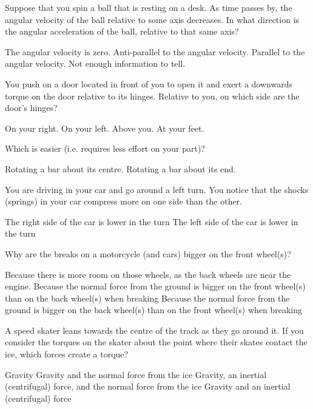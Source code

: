 \question Suppose that you spin a ball that is resting on a desk. As time passes by, the angular velocity of the ball relative to some axis decreases. In what direction is the angular acceleration of the ball, relative to that same axis?
\begin{checkboxes}
\choice The angular velocity is zero.
\CorrectChoice Anti-parallel to the angular velocity.
\choice Parallel to the angular velocity.
\choice Not enough information to tell.
\end{checkboxes}

\question You push on a door located in front of you to open it and exert a downwards torque on the door relative to its hinges. Relative to you, on which side are the door's hinges? 
\begin{checkboxes}
\CorrectChoice On your right.
\choice On your left. 
\choice Above you.
\choice At your feet.
\end{checkboxes}

\question Which is easier (i.e. requires less effort on your part)?
\begin{checkboxes}
\CorrectChoice Rotating a bar about its centre.
\choice Rotating a bar about its end.
\end{checkboxes}

\question You are driving in your car and go around a left turn. You notice that the shocks (springs) in your car compress more on one side than the other. 
\begin{checkboxes}
\CorrectChoice The right side of the car is lower in the turn \correct
\choice The left side of the car is lower in the turn
\end{checkboxes}

\question Why are the breaks on a motorcycle (and cars) bigger on the front wheel(s)?
\begin{checkboxes}
\choice Because there is more room on those wheels, as the back wheels are near the engine.
\CorrectChoice Because the normal force from the ground is bigger on the front wheel(s) than on the back wheel(s) when breaking \correct
\choice Because the normal force from the ground is bigger on the back wheel(s) than on the front wheel(s) when breaking
\end{checkboxes}

\question A speed skater leans towards the centre of the track as they go around it. If you consider the torques on the skater about the point where their skates contact the ice, which forces create a torque?
\begin{checkboxes}
\choice Gravity
\choice Gravity and the normal force from the ice
\choice Gravity, an inertial (centrifugal) force,  and the normal force from the ice
\CorrectChoice Gravity and an inertial (centrifugal) force \correct
\end{checkboxes}

